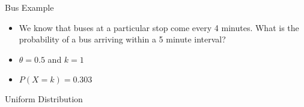 \documentclass{beamer}
\begin{document}
\begin{frame}{Bus Example}  
\begin{itemize} 
 \item We know that buses at a particular stop come every 4 minutes. What is the probability of a bus arriving within a 5 minute interval?
 \item $\theta = 0.5$ and $k = 1$ 
 \item $P(X = k) = 0.303$ 
\end{itemize}
\end{frame}

\begin{frame}{Uniform Distribution}  
 
\end{frame}
\end{document}
